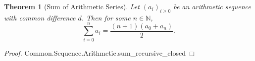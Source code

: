 \documentclass{article}
\newtheorem{theorem}{Theorem}
\begin{document}
\begin{theorem}[Sum of Arithmetic Series]

Let $(a_i)_{i \geq 0}$ be an arithmetic sequence with common difference $d$.
Then for some $n \in \mathbb{N}$,
$$\sum_{i=0}^n a_i = \frac{(n + 1)(a_0 + a_n)}{2}.$$

\end{theorem}

\begin{proof}

Common.Sequence.Arithmetic.sum\_recursive\_closed

\end{proof}
\end{document}

